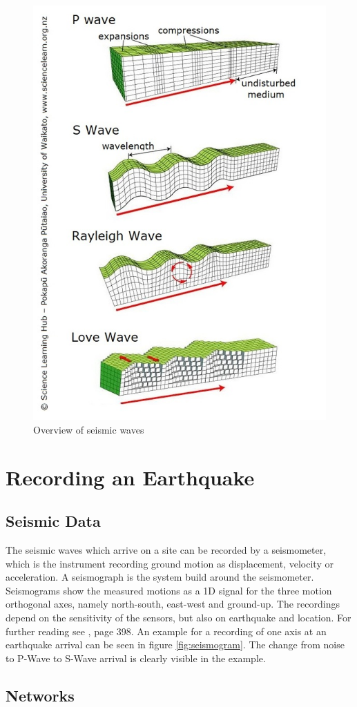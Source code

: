 \documentclass[thesis.tex]{subfiles}
\begin{document}
\begin{figure}[hb]
	\centering
	\includegraphics[width=0.6\linewidth]{../pictures/Prerequisites/waves.jpg}
	\caption{Overview of seismic waves}
	\label{fig:waves}
\end{figure}
\section{Recording an Earthquake}
\subsection{Seismic Data}
The seismic waves which arrive on a site can be recorded by a seismometer, which is the instrument recording ground motion as displacement, velocity or acceleration. A seismograph is the system build around the seismometer. Seismograms show the measured motions as a 1D signal for the three motion orthogonal axes, namely north-south, east-west and ground-up. The recordings depend on the sensitivity of the sensors, but also on earthquake and location. For further reading see \cite{IntroEarthquakes}, page 398. An example for a recording of one axis at an earthquake arrival can be seen in figure \ref{fig:seismogram}. The change from noise to P-Wave to S-Wave arrival is clearly visible in the example. 
\subsection{Networks}
\end{document}
